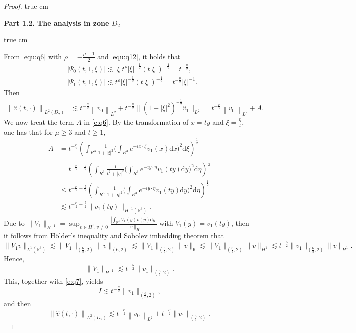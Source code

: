 \documentclass[10pt,a4paper]{amsart}
\newcommand{\R}{\mathbb R}
\newcommand{\f}{\frac}
\begin{document}
\begin{proof}
 true cm

{\bf Part 1.2.  The analysis  in zone $D_2$}

 true cm


From \eqref{equ:q6} with $\rho=-\f{\mu-1}{2}$ and \eqref{equ:q12}, it holds that
\begin{equation}\label{e:q5}
\begin{aligned}
& \left|\Psi_0(t, 1,\xi)\right| \lesssim|\xi| t^\rho|\xi|^{-\frac{1}{2}}(t|\xi|)^{-\frac{1}{2}}=t^{-\frac{\mu}{2}}, \\
& \left|\Psi_1(t, 1, \xi)\right|  \lesssim t^\rho|\xi|^{-\frac{1}{2}}(t|\xi|)^{-\frac{1}{2}}=t^{-\frac{\mu}{2}}|\xi|^{-1}.
\end{aligned}
\end{equation}
Then
\begin{equation}\label{e:q6}
\begin{aligned}
\left\|\hat{v}(t, \cdot)\right\|_{L^2(D_2)}
& \lesssim t^{-\frac{\mu}{2}}\left\|v_{0}\right\|_{L^{2}}+t^{-\f{\mu}{2}} \|(1+|\xi|^2)^{-\f{1}{2}}\hat{v}_{1}\|_{L^{2}}
= t^{-\frac{\mu}{2}}\left\|v_{0}\right\|_{L^{2}}+ A.
\end{aligned}
\end{equation}
We now treat the term $A$ in \eqref{e:q6}. By the transformation of $x=ty$ and $\xi=\f{\eta}{t}$, one has that for $\mu\geq 3$ and $t\geq1$,
\begin{equation}\label{e:q7}
\begin{aligned}
A & =t^{-\f{\mu}{2}} \left(\int_{R^3} \frac{1}{1+|\xi|^2}\big(\int_{R^3} e^{-i x \cdot \xi} v_1(x) \mathrm{d} x\big)^2 \mathrm{d}\xi\right)^{\frac{1}{2}}\\
& =t^{-\f{\mu}{2}+\f52}\left(\int_{R^3} \frac{1}{t^2+|\eta|^2}\big(\int_{R^3} e^{-i y \cdot \eta} v_1(ty) \mathrm{d} y\big)^2 \mathrm{d} \eta\right)^{\frac{1}{2}}\\
& \leq t^{-\f{\mu}{2}+\f52}\left(\int_{R^3} \frac{1}{1+|\eta|^2}\big(\int_{R^3} e^{-i y \cdot \eta} v_1(ty) \mathrm{d} y\big)^2 \mathrm{d} \eta\right)^{\frac{1}{2}}\\
& \lesssim t^{-\f{\mu}{2}+\f52}\|v_1(ty)\|_{H^{-1}(\R^3)}.
\end{aligned}
\end{equation}
Due to $\|V_1\|_{H^{-1}}=\sup _{v \in H^1, v \neq 0} \frac{\left|\int_{\mathbb{R}^3} V_1(y) v(y) \mathrm{d} y\right|}{\|v\|_{H^1}}$
with $V_1(y)=v_1(ty)$, then it follows from H\"{o}lder's inequality and Sobolev imbedding theorem that
\begin{equation}\label{e:q8}
\|V_1 v\|_{L^1(\R^3)} \lesssim\|V_1\|_{(\f65, 2)}\|v\|_{\left(6, 2\right)} \lesssim\|V_1\|_{(\f65, 2)}\|v\|_{6} \lesssim\|V_1\|_{(\f65, 2)}\|v\|_{H^1}\lesssim t^{-\f{5}{2}}\|v_1\|_{(\f65, 2)}\|v\|_{H^1}.
\end{equation}
Hence,
$$
\|V_1\|_{H^{-1}}\lesssim t^{-\f{5}{2}}\|v_1\|_{(\f65, 2)}.
$$
This, together with \eqref{e:q7}, yields
$$
I\lesssim t^{-\f{\mu}{2}}\|v_1\|_{(\f65, 2)},
$$
and then
\begin{equation}\label{e:q9}
\left\|\hat{v}(t, \cdot)\right\|_{L^2(D_2)}\lesssim t^{-\frac{\mu}{2}}\left\|v_{0}\right\|_{L^{2}}+ t^{-\f{\mu}{2}}\|v_1\|_{(\f65, 2)}.
\end{equation}


\end{proof}
\end{document}
